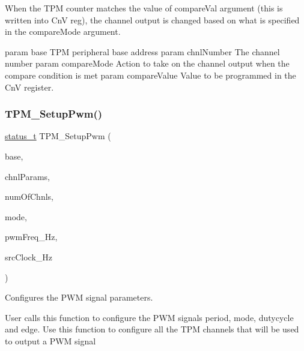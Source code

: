 When the T\+PM counter matches the value of compare\+Val argument (this is written into CnV reg), the channel output is changed based on what is specified in the compare\+Mode argument.

param base T\+PM peripheral base address param chnl\+Number The channel number param compare\+Mode Action to take on the channel output when the compare condition is met param compare\+Value Value to be programmed in the CnV register. \mbox{\label{group__tpm_gad52f4e6f23ba1d127f5d5f3f30b49dbd}} 
\subsubsection{\texorpdfstring{TPM\_SetupPwm()}{TPM\_SetupPwm()}}
{\footnotesize\ttfamily \mbox{\hyperlink{group__ksdk__common_gaaabdaf7ee58ca7269bd4bf24efcde092}{status\+\_\+t}} T\+P\+M\+\_\+\+Setup\+Pwm (\begin{DoxyParamCaption}\item[{\mbox{\hyperlink{struct_t_p_m___type}{T\+P\+M\+\_\+\+Type}} $\ast$}]{base,  }\item[{const \mbox{\hyperlink{group__tpm_ga19383e0a3baf4033a37e96df9016ab1c}{tpm\+\_\+chnl\+\_\+pwm\+\_\+signal\+\_\+param\+\_\+t}} $\ast$}]{chnl\+Params,  }\item[{uint8\+\_\+t}]{num\+Of\+Chnls,  }\item[{\mbox{\hyperlink{group__tpm_ga3575f319c9fbc1aa574a1054c14e7dab}{tpm\+\_\+pwm\+\_\+mode\+\_\+t}}}]{mode,  }\item[{uint32\+\_\+t}]{pwm\+Freq\+\_\+\+Hz,  }\item[{uint32\+\_\+t}]{src\+Clock\+\_\+\+Hz }\end{DoxyParamCaption})}



Configures the P\+WM signal parameters. 

User calls this function to configure the P\+WM signals period, mode, dutycycle and edge. Use this function to configure all the T\+PM channels that will be used to output a P\+WM signal


